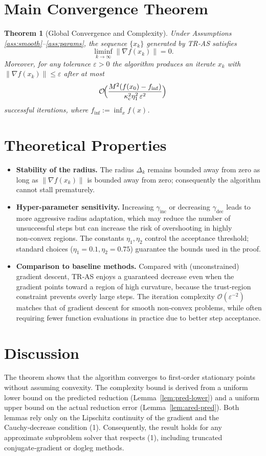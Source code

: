 \documentclass{article}
\newtheorem{theorem}{Theorem}
\newcommand{\norm}[1]{\left\lVert#1\right\rVert}
\begin{document}
\section*{Main Convergence Theorem}
\begin{theorem}[Global Convergence and Complexity]\label{thm:main}
Under Assumptions \ref{ass:smooth}–\ref{ass:params}, the sequence
\(\{x_k\}\) generated by TR‑AS satisfies
\[
\liminf_{k\to\infty}\norm{\nabla f(x_k)} = 0.
\]
Moreover, for any tolerance \(\varepsilon>0\) the algorithm produces an iterate
\(x_{k}\) with \(\norm{\nabla f(x_k)}\le\varepsilon\) after at most
\[
\mathcal{O}\!\Bigl(\frac{M^2 (f(x_0)-f_{\inf})}{\kappa_{\mathrm{c}}^2 \eta_1^2\,
\varepsilon^{2}}\Bigr)
\]
successful iterations, where \(f_{\inf}:=\inf_{x}f(x)\).
\end{theorem}

\section*{Theoretical Properties}
\begin{itemize}[leftmargin=*]
\item \textbf{Stability of the radius.}  The radius \(\Delta_k\) remains bounded
away from zero as long as \(\norm{\nabla f(x_k)}\) is bounded away from zero;
consequently the algorithm cannot stall prematurely.
\item \textbf{Hyper‑parameter sensitivity.}
Increasing \(\gamma_{\mathrm{inc}}\) or decreasing \(\gamma_{\mathrm{dec}}\) leads to
more aggressive radius adaptation, which may reduce the number of
unsuccessful steps but can increase the risk of overshooting in highly
non‑convex regions.  The constants \(\eta_1,\eta_2\) control the acceptance
threshold; standard choices (\(\eta_1=0.1,\eta_2=0.75\)) guarantee the bounds
used in the proof.
\item \textbf{Comparison to baseline methods.}
Compared with (unconstrained) gradient descent, TR‑AS enjoys a guaranteed
decrease even when the gradient points toward a region of high curvature,
because the trust‑region constraint prevents overly large steps.
The iteration complexity \(\mathcal{O}(\varepsilon^{-2})\) matches that of
gradient descent for smooth non‑convex problems, while often requiring fewer
function evaluations in practice due to better step acceptance.
\end{itemize}

\section*{Discussion}
The theorem shows that the algorithm converges to first‑order stationary points
without assuming convexity.  The complexity bound is derived from a uniform
lower bound on the predicted reduction (Lemma~\ref{lem:pred-lower}) and a
uniform upper bound on the actual reduction error (Lemma~\ref{lem:ared-pred}).
Both lemmas rely only on the Lipschitz continuity of the gradient and the
Cauchy‑decrease condition (1).  Consequently, the result holds for any
approximate subproblem solver that respects (1), including truncated
conjugate‑gradient or dogleg methods.
\end{document}
